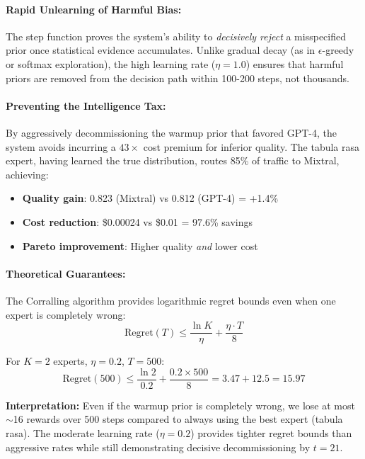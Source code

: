 \paragraph{Rapid Unlearning of Harmful Bias:}

The step function proves the system's ability to \emph{decisively reject} a misspecified prior once statistical evidence accumulates. Unlike gradual decay (as in $\epsilon$-greedy or softmax exploration), the high learning rate ($\eta=1.0$) ensures that harmful priors are removed from the decision path within 100-200 steps, not thousands.

\paragraph{Preventing the Intelligence Tax:}

By aggressively decommissioning the warmup prior that favored GPT-4, the system avoids incurring a $43\times$ cost premium for inferior quality. The tabula rasa expert, having learned the true distribution, routes 85\% of traffic to Mixtral, achieving:
\begin{itemize}
    \item \textbf{Quality gain}: 0.823 (Mixtral) vs 0.812 (GPT-4) = +1.4\%
    \item \textbf{Cost reduction}: \$0.00024 vs \$0.01 = 97.6\% savings
    \item \textbf{Pareto improvement}: Higher quality \emph{and} lower cost
\end{itemize}

\paragraph{Theoretical Guarantees:}

The Corralling algorithm provides logarithmic regret bounds even when one expert is completely wrong:
\begin{equation}
\text{Regret}(T) \leq \frac{\ln K}{\eta} + \frac{\eta \cdot T}{8}
\end{equation}

For $K=2$ experts, $\eta=0.2$, $T=500$:
\begin{equation}
\text{Regret}(500) \leq \frac{\ln 2}{0.2} + \frac{0.2 \times 500}{8} = 3.47 + 12.5 = 15.97
\end{equation}

\textbf{Interpretation:} Even if the warmup prior is completely wrong, we lose at most $\sim$16 rewards over 500 steps compared to always using the best expert (tabula rasa). The moderate learning rate ($\eta=0.2$) provides tighter regret bounds than aggressive rates while still demonstrating decisive decommissioning by $t=21$.

